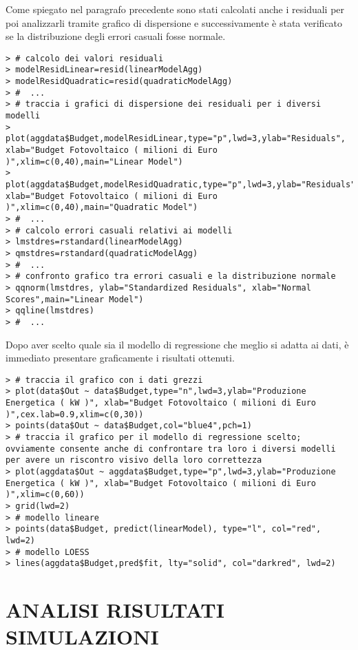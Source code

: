 \documentclass[12pt,a4paper,openright,twoside]{report}
\begin{document}
Come spiegato nel paragrafo precedente sono stati calcolati anche i residuali per poi analizzarli tramite grafico di dispersione e successivamente è stata verificato se la distribuzione degli errori casuali fosse normale.

\begin{lstlisting}
> # calcolo dei valori residuali
> modelResidLinear=resid(linearModelAgg)
> modelResidQuadratic=resid(quadraticModelAgg)
> #  ...
> # traccia i grafici di dispersione dei residuali per i diversi modelli
> plot(aggdata$Budget,modelResidLinear,type="p",lwd=3,ylab="Residuals", xlab="Budget Fotovoltaico ( milioni di Euro )",xlim=c(0,40),main="Linear Model") 
> plot(aggdata$Budget,modelResidQuadratic,type="p",lwd=3,ylab="Residuals", xlab="Budget Fotovoltaico ( milioni di Euro )",xlim=c(0,40),main="Quadratic Model") 
> #  ...
> # calcolo errori casuali relativi ai modelli
> lmstdres=rstandard(linearModelAgg)
> qmstdres=rstandard(quadraticModelAgg)
> #  ...
> # confronto grafico tra errori casuali e la distribuzione normale
> qqnorm(lmstdres, ylab="Standardized Residuals", xlab="Normal Scores",main="Linear Model") 
> qqline(lmstdres)
> #  ...
\end{lstlisting}

Dopo aver scelto quale sia il modello di regressione che meglio si adatta ai dati, è immediato presentare graficamente i risultati ottenuti.

\begin{lstlisting}
> # traccia il grafico con i dati grezzi
> plot(data$Out ~ data$Budget,type="n",lwd=3,ylab="Produzione Energetica ( kW )", xlab="Budget Fotovoltaico ( milioni di Euro )",cex.lab=0.9,xlim=c(0,30))
> points(data$Out ~ data$Budget,col="blue4",pch=1)
> # traccia il grafico per il modello di regressione scelto; ovviamente consente anche di confrontare tra loro i diversi modelli per avere un riscontro visivo della loro correttezza
> plot(aggdata$Out ~ aggdata$Budget,type="p",lwd=3,ylab="Produzione Energetica ( kW )", xlab="Budget Fotovoltaico ( milioni di Euro )",xlim=c(0,60)) 
> grid(lwd=2)
> # modello lineare
> points(data$Budget, predict(linearModel), type="l", col="red", lwd=2)
> # modello LOESS
> lines(aggdata$Budget,pred$fit, lty="solid", col="darkred", lwd=2)
\end{lstlisting}

\section[ANALISI RISULTATI]{ANALISI RISULTATI SIMULAZIONI}
\end{document}
